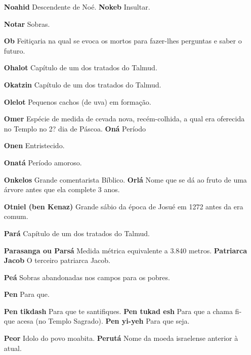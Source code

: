 \begin{itemize}
\begin{enumrate}
\begin{itemize}
\begin{itemize}
\begin{itemize}
\begin{itemize}
\begin{itemize}
\item[\textbf{Noahid} Descendente de Noé. \textbf{Nokeb}] Insultar.

\item[\textbf{Notar}] Sobras.

\item[\textbf{Ob}] Feitiçaria na qual se evoca os mor­tos para fazer-lhes
perguntas e saber o futuro.

\item[\textbf{Ohalot}] Capítulo de um dos tratados do Talmud.

\item[\textbf{Okatzin}] Capítulo de um dos tratados do Talmud.

\item[\textbf{Olelot}] Pequenos cachos (de uva) em formação.

\item[\textbf{Omer}] Espécie de medida de cevada nova, recém-colhida, a qual
era ofere­cida no Templo no 2? dia de Páscoa. \textbf{Oná} Período

\item[\textbf{Onen}] Entristecido.

\item[\textbf{Onatá}] Período amoroso.

\item[\textbf{Onkelos} Grande comentarista Bíblico. \textbf{Orlá}] Nome que
se dá ao fruto de uma árvore antes que ela complete 3 anos.
\item[\textbf{Otniel (ben Kenaz)}] Grande sábio da época de Josué em 1272
antes da era comum.

\item[\textbf{Pará}] Capítulo de um dos tratados do Talmud.

\item[\textbf{Parasanga ou Parsá}] Medida métri­ca equivalente a 3.840
metros. \textbf{Patriarca Jacob} O terceiro patriar­ca Jacob.

\item[\textbf{Peá}] Sobras abandonadas nos campos para os pobres.

\item[\textbf{Pen}] Para que.

\item[\textbf{Pen tikdash} Para que te santifiques. \textbf{Pen tukad esh}]
Para que a chama fi­que acesa (no Templo Sagrado). \textbf{Pen yi-yeh}
Para que seja.

\item[\textbf{Peor} Idolo do povo moabita. \textbf{Perutá}] Nome da moeda
israelense anterior à atual.


\end{itemize}
\end{itemize}
\end{itemize}
\end{itemize}
\end{itemize}
\end{enumrate}
\end{itemize}
